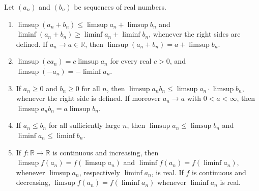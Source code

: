 \begin{proposition}
\label{prop:limsup-arith}
Let $(a_n)$ and $(b_n)$ be sequences of real numbers.
\begin{enumerate}
\item $\limsup(a_n+b_n)\le\limsup a_n+\limsup b_n$ and $\liminf(a_n+b_n)\ge\liminf a_n+\liminf b_n$, whenever the right sides are defined. If $a_n\to a\in\mathbb R$, then $\limsup(a_n+b_n)=a+\limsup b_n$.
\item $\limsup(ca_n)=c\limsup a_n$ for every real $c>0$, and $\limsup(-a_n)=-\liminf a_n$.
\item If $a_n\ge0$ and $b_n\ge0$ for all $n$, then $\limsup a_nb_n\le\limsup a_n\cdot\limsup b_n$, whenever the right side is defined. If moreover $a_n\to a$ with $0<a<\infty$, then $\limsup a_nb_n=a\limsup b_n$.
\item If $a_n\le b_n$ for all sufficiently large $n$, then $\limsup a_n\le\limsup b_n$ and $\liminf a_n\le\liminf b_n$.
\item If $f\colon\mathbb R\to\mathbb R$ is continuous and increasing, then $\limsup f(a_n)=f(\limsup a_n)$ and $\liminf f(a_n)=f(\liminf a_n)$, whenever $\limsup a_n$, respectively $\liminf a_n$, is real. If $f$ is continuous and decreasing, $\limsup f(a_n)=f(\liminf a_n)$ whenever $\liminf a_n$ is real.
\end{enumerate}
\end{proposition}

